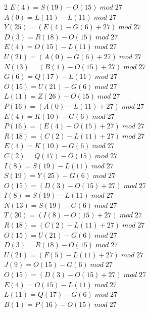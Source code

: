 \documentclass{article}
\begin{document}
\begin{enumerate}
\begin{multicols}{2}
$E (4) = S (19) - O (15) \;  mod \; 27$\\
$A (0) = L (11) - L (11)\;  mod \; 27$\\
$Y (25) = (E (4) - G (6) + 27) \;  mod \; 27$\\
$D (3) = R (18) - O (15) \;  mod \; 27$\\
$E (4) = O (15) - L (11)\;  mod \; 27$\\
$U (21) = (A (0) - G (6) + 27) \;  mod \; 27$\\
$N (13) = (B (1) - O (15) + 27) \;  mod \; 27$\\
$G (6) = Q (17) - L (11)\;  mod \; 27$\\
$O (15) = U (21) - G (6) \;  mod \; 27$\\
$L (11) = Z (26) - O (15) \;  mod \; 27$\\
$P (16) = (A (0) - L (11) + 27) \;  mod \; 27$\\
$E (4) = K (10) - G (6) \;  mod \; 27$\\
$P (16) = (E (4) - O (15) +27) \;  mod \; 27$\\
$R (18) = (C (2) - L (11) + 27) \;  mod \; 27$\\
$E (4) = K (10) - G (6) \;  mod \; 27$\\
$C (2) = Q (17) - O (15) \;  mod \; 27$\\
$I (8) = S (19) - L (11)  \;  mod \; 27$\\
$S (19) = Y (25) - G (6) \;  mod \; 27$\\
$O (15) = (D (3) - O (15) +27) \;  mod \; 27$\\
$I (8) = S (19) - L (11)  \;  mod \; 27$\\
$N (13) = S (19) - G (6) \;  mod \; 27$\\
$T (20) = (I (8) - O (15) +27) \;  mod \; 27$\\
$R (18) = (C (2) - L (11) +27)  \;  mod \; 27$\\
$O (15) = U (21) - G (6) \;  mod \; 27$\\
$D (3) = R (18) - O (15)  \;  mod \; 27$\\
$U (21) = (F (5) - L (11) +27)  \;  mod \; 27$\\
$J (9) = O (15) - G (6) \;  mod \; 27$\\
$O (15) = (D (3) - O (15) + 27)  \;  mod \; 27$\\
$E (4) = O (15) - L (11) \;  mod \; 27$\\
$L (11) = Q (17) - G (6) \;  mod \; 27$\\
$B (1) = P (16) - O (15)  \;  mod \; 27$\\

\end{multicols}
\end{enumerate}
\end{document}
